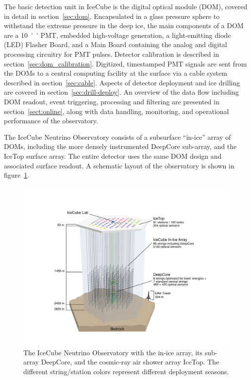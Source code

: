 The basic detection unit in IceCube is the
digital optical module (DOM), covered in detail in section~\ref{sec:dom}.
Encapsulated in a glass pressure sphere 
to withstand the extreme pressure in the deep ice, the main components of a DOM
are a \SI{10}{''} PMT, embedded high-voltage generation, a
light-emitting diode (LED) Flasher 
Board, and a Main Board containing the analog and digital processing circuitry
for PMT pulses.  Detector calibration
is described in section~\ref{sec:dom_calibration}.  Digitized, timestamped
PMT signals are sent from the DOMs to a
central computing facility at the surface via a cable system described in
section~\ref{sec:cable}.  Aspects of detector deployment and ice drilling are
covered in section~\ref{sec:drill-deploy}.  An overview of the data flow including
DOM readout, event triggering, processing and filtering are presented in
section~\ref{sect:online}, along with data handling, monitoring, and operational performance of
the observatory.

The IceCube Neutrino Observatory consists of a subsurface
``in-ice'' array of DOMs, including the more densely instrumented
DeepCore sub-array, and the IceTop surface array.  The entire detector
uses the same DOM design and associated surface readout. A schematic layout
of the observatory is shown in figure~\ref{fig:array}. 

\begin{figure}[!ht]
 \centering
 \includegraphics[width=\textwidth]{graphics/intro/ArrayWSeasonsLabels_crop.pdf}
 \caption{The IceCube Neutrino Observatory with the in-ice array, its sub-array DeepCore, and
   the cosmic-ray air shower array IceTop. The different string/station colors
   represent different deployment seasons.}
 \label{fig:array}
\end{figure}

